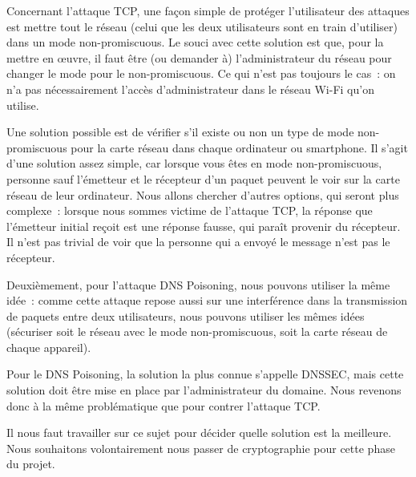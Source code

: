 \documentclass[a4paper, 12pt,twoside]{article}
\begin{document}
    Concernant l'attaque TCP, une façon simple de protéger l'utilisateur des attaques est mettre tout le réseau (celui que les deux utilisateurs sont en train d'utiliser) dans un mode non-promiscuous. Le souci avec cette solution est que, pour la mettre en \oe{}uvre, il faut être (ou demander à) l'administrateur du réseau pour changer le mode pour le non-promiscuous. Ce qui n'est pas toujours le cas~: on n'a pas nécessairement l'accès d'administrateur dans le réseau Wi-Fi qu'on utilise.

    Une solution possible est de vérifier s'il existe ou non un type de mode non-promiscuous pour la carte réseau dans chaque ordinateur ou smartphone. Il s'agit d'une solution assez simple, car lorsque vous êtes en mode non-promiscuous, personne sauf l'émetteur et le récepteur d'un paquet peuvent le voir sur la carte réseau de leur ordinateur. Nous allons chercher d'autres options, qui seront plus complexe~:  lorsque nous sommes victime de l'attaque TCP, la réponse que l'émetteur initial reçoit est une réponse fausse, qui paraît provenir du récepteur. Il n'est pas trivial de voir que la personne qui a envoyé le message n'est pas le récepteur.

    Deuxièmement, pour l'attaque DNS Poisoning, nous pouvons utiliser la même idée~: comme cette attaque repose aussi sur une  interférence dans la transmission de paquets entre deux utilisateurs, nous pouvons utiliser les mêmes idées (sécuriser soit le réseau avec le mode non-promiscuous, soit la carte réseau de chaque appareil).

    Pour le DNS Poisoning, la solution la plus connue s'appelle DNSSEC, mais cette solution doit être mise en place par l'administrateur du domaine. Nous revenons donc à la même problématique que pour contrer l'attaque TCP.

    Il nous faut travailler sur ce sujet pour décider quelle solution est la meilleure. Nous souhaitons volontairement nous passer de cryptographie pour cette phase du projet.


\end{document}
